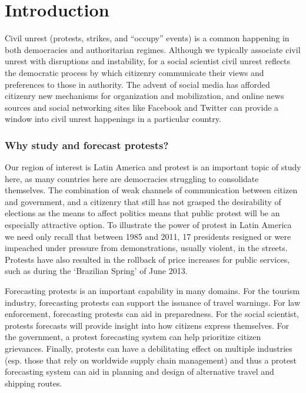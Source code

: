 \section{Introduction}
Civil unrest (protests, strikes, and ``occupy'' events) is a common happening in both democracies
and authoritarian regimes.
Although we typically associate civil unrest with disruptions and instability, for a social scientist
civil unrest reflects the democratic process by 
which citizenry communicate their views and preferences to those in authority. 
The advent of social
media has afforded citizenry new mechanisms for organization and mobilization, and online news sources
and social networking sites like Facebook and Twitter
can provide a window into civil unrest happenings in a particular country.

\subsubsection{Why study and forecast protests?}
Our region of interest is Latin America and protest
is an important topic of study here,
as many countries here are democracies struggling to consolidate themselves. The combination of weak channels of communication 
between citizen and government, and a citizenry that still has not grasped the desirability of elections as the means to affect politics 
means that public protest will be an especially attractive option. To 
illustrate the power of protest in Latin America we need only recall 
that between 1985 and 2011, 17 presidents resigned or were impeached under pressure from demonstrations, usually violent, in the streets. Protests have 
also resulted in the rollback of price increases for public services, such as during the ‘Brazilian Spring’ of June 2013.

Forecasting protests is an important capability in many domains.
For the tourism industry, forecasting protests can
support the issuance of travel warnings. For law enforcement,
forecasting protests can aid in preparedness. For the social scientist,
protests forecasts will provide insight into how citizens express themselves.
For the government, a protest forecasting system can help prioritize
citizen grievances. Finally, protests can have a debilitating effect on
multiple industries (esp. those that rely on worldwide supply chain management)
and thus a protest forecasting system can aid in planning and design
of alternative travel and shipping routes.

